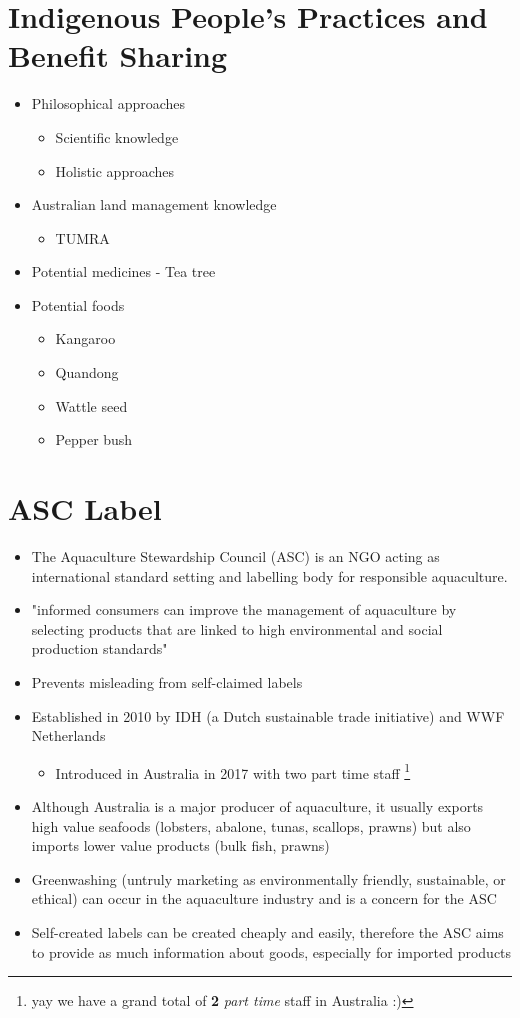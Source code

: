 \section{Indigenous People's Practices and Benefit Sharing} \label{20/11/2024}
	\begin{itemize}
		\item Philosophical approaches
		\begin{itemize}
			\item Scientific knowledge
			\item Holistic approaches
		\end{itemize}
		\item Australian land management knowledge
		\begin{itemize}
			\item TUMRA
		\end{itemize}
		\item Potential medicines - Tea tree
		\item Potential foods
		\begin{itemize}
			\item Kangaroo
			\item Quandong
			\item Wattle seed
			\item Pepper bush
		\end{itemize}
	\end{itemize}

\section{ASC Label} \label{28/11/2024}
	\begin{itemize}
		\item The Aquaculture Stewardship Council (ASC) is an NGO acting as international standard setting and labelling body for responsible aquaculture.
		\item "informed consumers can improve the management of aquaculture by selecting products that are linked to high environmental and social production standards"
		\item Prevents misleading from self-claimed labels
		\item Established in 2010 by IDH (a Dutch sustainable trade initiative) and WWF Netherlands
			\begin{itemize}
				\item Introduced in Australia in 2017 with two part time staff \footnote{yay we have a grand total of \textbf{2} \textit{part time} staff in Australia :)}
			\end{itemize}
		\item Although Australia is a major producer of aquaculture, it usually exports high value seafoods (lobsters, abalone, tunas, scallops, prawns) but also imports lower value products (bulk fish, prawns)
		\item Greenwashing (untruly marketing as environmentally friendly, sustainable, or ethical) can occur in the aquaculture industry and is a concern for the ASC
		\item Self-created labels can be created cheaply and easily, therefore the ASC aims to provide as much information about goods, especially for imported products
	\end{itemize}